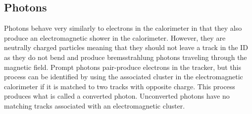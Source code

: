 \subsection{Photons}
Photons behave very similarly to electrons in the calorimeter in that they also produce an electromagnetic shower in the calorimeter.  However, they are neutrally charged particles meaning that they should not leave a track in the ID as they do not bend and produce bremsstrahlung photons traveling through the magnetic field.  Prompt photons pair-produce electrons in the tracker, but this process can be identified by using the associated cluster in the electromagnetic calorimeter if it is matched to two tracks with opposite charge.  This process produces what is called a converted photon.  Unconverted photons have no matching tracks associated with an electromagnetic cluster.   

